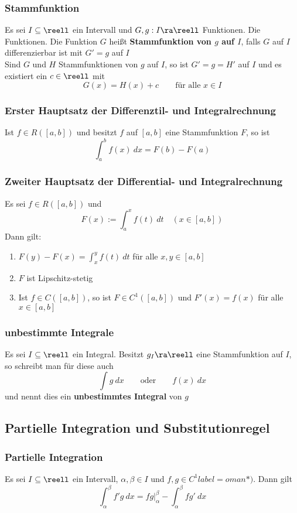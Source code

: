 \documentclass{kit}
\begin{document}
    \subsubsection{Stammfunktion}
      Es sei $I\subseteq\reell$ ein Intervall und $G,g:I\ra\reell$ Funktionen. Die Funktionen. Die Funktion $G$ heißt \textbf{Stammfunktion von $g$ auf $I$}, falls $G$ auf $I$ differenzierbar ist mit $G'=g$ auf $I$\\
      Sind $G$ und $H$ Stammfunktionen von $g$ auf $I$, so ist $G'=g=H'$ auf $I$ und es existiert ein $c\in\reell$ mit
      $$G(x)=H(x)+c\qquad\text{für alle }x\in I$$
    \subsubsection{Erster Hauptsatz der Differenztil- und Integralrechnung}
      Ist $f\in R([a,b])$ und besitzt $f$ auf $[a,b]$ eine Stammfunktion $F$, so ist
      $$\int^b_af(x)\ dx=F(b)-F(a)$$
    \subsubsection{Zweiter Hauptsatz der Differential- und Integralrechnung}
      Es sei $f\in R([a,b])$ und
      $$F(x):=\int^x_af(t)\ dt\quad(x\in[a,b])$$
      Dann gilt:
      \begin{enumerate}
        \item $F(y)-F(x)=\int^y_xf(t)\ dt$ für alle $x,y\in[a,b]$
        \item $F$ ist Lipschitz-stetig
        \item Ist $f\in C([a,b])$, so ist $F\in C^1([a,b])$ und $F'(x)=f(x)$ für alle $x\in[a,b]$
      \end{enumerate}
    \subsubsection{unbestimmte Integrale}
      Es sei $I\subseteq\reell$ ein Integral. Besitzt $g_I\ra\reell$ eine Stammfunktion auf $I$, so schreibt man für diese auch
      $$\int g\ dx\qquad\text{oder}\qquad f(x)\ dx$$
      und nennt dies ein \textbf{unbestimmtes Integral} von $g$
  \subsection{Partielle Integration und Substitutionregel}
    \subsubsection{Partielle Integration}
      Es sei $I\subseteq\reell$ ein Intervall, $\alpha,\beta\in I$ und $f,g\in C^1label=
oman*)$. Dann gilt
      $$\int^\beta_\alpha f'g\ dx=fg\bigg\rvert^\beta_\alpha-\int^\beta_\alpha fg'\ dx$$
\end{document}
